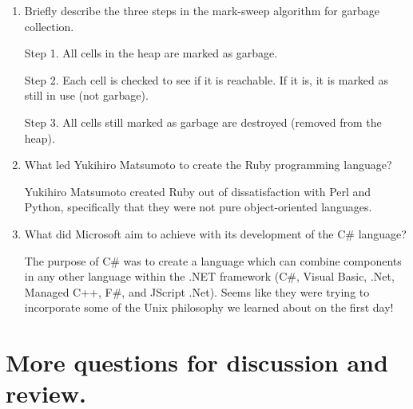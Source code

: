\begin{enumerate}
\begin{answer}
    \end{answer}

  \item Briefly describe the three steps in the mark-sweep algorithm
    for garbage collection.

  \begin{answer}

    Step 1. All cells in the heap are marked as garbage.

    Step 2. Each cell is checked to see if it is reachable. If it is,
    it is marked as still in use (not garbage).

    Step 3. All cells still marked as garbage are destroyed (removed
    from the heap).

    \end{answer}

  \item What led Yukihiro Matsumoto to create the Ruby programming language?

  \begin{answer}

    Yukihiro Matsumoto created Ruby out of dissatisfaction with Perl
    and Python, specifically that they were not pure object-oriented
    languages.

    \end{answer}

  \item What did Microsoft aim to achieve with its development of the
    C\# language?

  \begin{answer}

    The purpose of C\# was to create a language which can combine
    components in any other language within the .NET framework (C\#,
    Visual Basic, .Net, Managed C++, F\#, and JScript .Net). Seems
    like they were trying to incorporate some of the Unix philosophy
    we learned about on the first day!

    \end{answer}

  \end{enumerate}



\section{More questions for discussion and review.}

